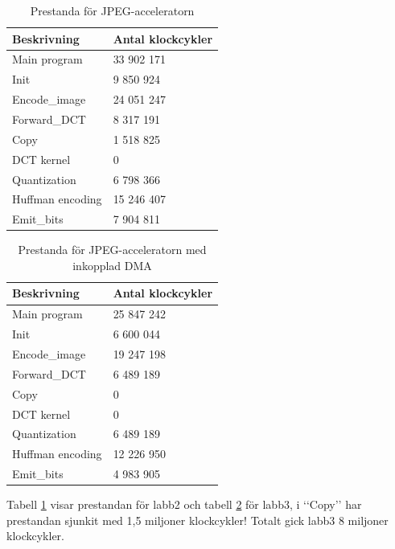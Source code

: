 \documentclass[a4paper]{article}
\begin{document}
\begin{table}[H]
    \centering
    \begin{tabular}{l l}

        Beskrivning & Antal klockcykler\\
        \hline
        Main program  & 33 902 171 \\
        Init  &  9 850 924 \\
        Encode\_image  & 24 051 247 \\
        Forward\_DCT  & 8 317 191 \\
        Copy  & 1 518 825 \\
        DCT kernel  & 0 \\
        Quantization  & 6 798 366 \\
        Huffman encoding  & 15 246 407 \\
        Emit\_bits  & 7 904 811 \\
    \end{tabular}
    \caption{ Prestanda för JPEG-acceleratorn }
    \label{tab:jpeg_performance_2}
\end{table}
\begin{table}[H]
    \centering
    \begin{tabular}{l l}

        Beskrivning & Antal klockcykler\\
        \hline
        Main program  & 25 847 242 \\
        Init  & 6 600 044 \\
        Encode\_image  & 19 247 198 \\
        Forward\_DCT  & 6 489 189 \\
        Copy  & 0 \\
        DCT kernel  & 0 \\
        Quantization  & 6 489 189 \\
        Huffman encoding  & 12 226 950 \\
        Emit\_bits  & 4 983 905 \\
    \end{tabular}
    \caption{ Prestanda för JPEG-acceleratorn med inkopplad DMA }
    \label{tab:jpeg_performance_3}
\end{table}

Tabell \ref{tab:jpeg_performance_2} visar prestandan för labb2 och
tabell \ref{tab:jpeg_performance_3} för labb3, i \lq\lq{}Copy\rq\rq{}
har prestandan sjunkit med 1,5 miljoner klockcykler! Totalt gick labb3 8
miljoner klockcykler.
\end{document}
